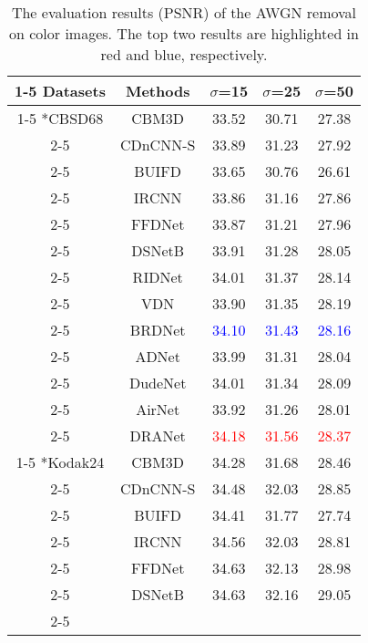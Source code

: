 \documentclass[3p,times]{elsarticle}
\begin{document}
\begin{table*}[htbp]
\centering
\caption{The evaluation results (PSNR) of the AWGN removal on color images. The top two results are highlighted in red and blue, respectively.}
\label{tab:color_PSNR}
\begin{tabular}{ccccc}
\cline{1-5}
Datasets &  Methods & $\sigma$=15 & $\sigma$=25 & $\sigma$=50 \\
\cline{1-5}
\multirow{13}*{CBSD68} & CBM3D \cite{Dabov2007} & 33.52 & 30.71 & 27.38\\
\cline{2-5}
    & CDnCNN-S \cite{Zhang2017} & 33.89 & 31.23 & 27.92 \\
\cline{2-5}
    & BUIFD \cite{Helou2020} & 33.65 & 30.76 & 26.61 \\
\cline{2-5}
    & IRCNN \cite{ZhangZGZ2017} & 33.86 & 31.16 & 27.86\\
\cline{2-5}
    & FFDNet \cite{Zhang2018} & 33.87 & 31.21 & 27.96\\
\cline{2-5}
    & DSNetB \cite{Peng2019} & 33.91 & 31.28 & 28.05\\
\cline{2-5}
    & RIDNet \cite{Anwar2019} & 34.01 & 31.37 & 28.14\\
\cline{2-5}
    & VDN \cite{Yue2019} & 33.90 & 31.35 & 28.19\\
\cline{2-5}
    & BRDNet \cite{Tian2020} & \textcolor{blue}{34.10} & \textcolor{blue}{31.43} & \textcolor{blue}{28.16} \\
\cline{2-5}
    & ADNet \cite{TianX2020} & 33.99 & 31.31 & 28.04\\
\cline{2-5}
    & DudeNet \cite{Tian2021} & 34.01 & 31.34 & 28.09\\
\cline{2-5}
    & AirNet \cite{Li2022} & 33.92 & 31.26 & 28.01\\
\cline{2-5}
    & DRANet & \textcolor{red}{34.18} & \textcolor{red}{31.56} & \textcolor{red}{28.37}\\
\cline{1-5}
\multirow{12}*{Kodak24} & CBM3D \cite{Dabov2007} & 34.28 & 31.68 & 28.46\\
\cline{2-5}
    & CDnCNN-S \cite{Zhang2017} & 34.48 & 32.03 & 28.85 \\
\cline{2-5}
    & BUIFD \cite{Helou2020} & 34.41 & 31.77 & 27.74\\
\cline{2-5}
    & IRCNN \cite{ZhangZGZ2017} & 34.56 & 32.03 & 28.81\\
\cline{2-5}
    & FFDNet \cite{Zhang2018} & 34.63 & 32.13 & 28.98 \\
\cline{2-5}
    & DSNetB \cite{Peng2019} & 34.63 & 32.16 & 29.05 \\
\cline{2-5}

\end{tabular}
\end{table*}
\end{document}
